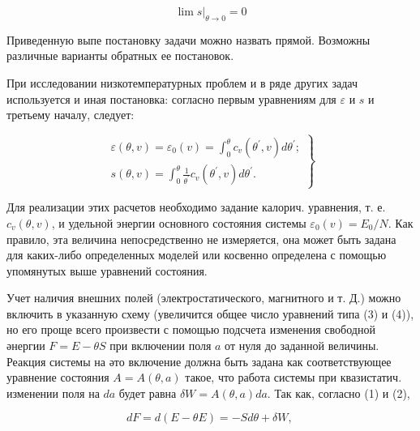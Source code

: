 \documentclass[10pt]{article}
\begin{document}
\[

\left.\lim s\right|_{\theta \rightarrow 0}=0

\]



Приведенную выпе постановку задачи можно назвать прямой. Возможны различные варианты обратных ее постановок.



При исследовании низкотемпературных проблем и в ряде других задач используется и иная постановка: согласно первым уравнениям для $\varepsilon$ и $s$ и третьему началу, следует:



\[

\left.\begin{array}{l}

\varepsilon(\theta, v)=\varepsilon_{0}(v)=\int_{0}^{\theta} c_{v}\left(\theta^{\prime}, v\right) d \theta^{\prime} ; \\

s(\theta, v)=\int_{0}^{\theta} \frac{1}{\theta^{\prime}} c_{v}\left(\theta^{\prime}, v\right) d \theta^{\prime} .

\end{array}\right\}

\]



Для реализации этих расчетов необходимо задание калорич. уравнения, т. е. $c_{v}(\theta, v)$, и удельной энергии основного состояния системы $\varepsilon_{0}(v)=E_{0} / N$. Как правило, эта величина непосредственно не измеряется, она может быть задана для каких-либо определенных моделей или косвенно определена с помощью упомянутых выше уравнений состояния.



Учет наличия внешних полей (электростатического, магнитного и т. Д.) можно включить в указанную схему (увеличится общее число уравнений типа (3) и (4)), но его проще всего произвести с помощью подсчета изменения свободной әнергии $F=E-\theta S$ при включении поля $a$ от нуля до заданной величины. Реакция системы на әто включение должна быть задана как соответствующее уравнение состояния $A=A(\theta, a)$ такое, что работа системы при квазистатич. изменении поля на $d a$ будет равна $\delta W=A(\theta, a) d a$. Так как, согласно (1) и (2),



\[

d F=d(E-\theta E)=-S d \theta+\delta W \text {, }

\]
\end{document}
